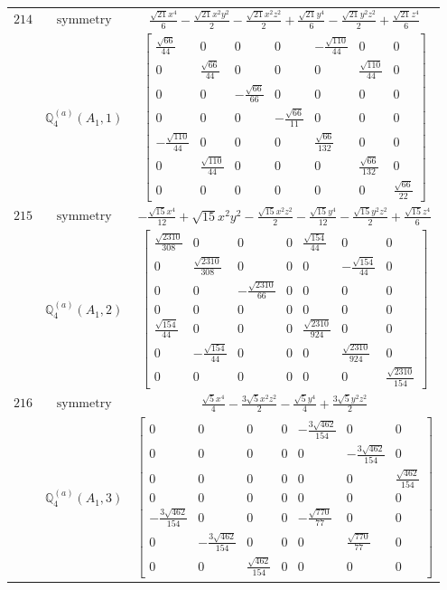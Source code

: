 \documentclass[fleqn,8pt,landscape]{jsarticle}
\begin{document}
\begin{longtable}{ccc}
$ 214 $ & $ \text{symmetry} $ & $ \frac{\sqrt{21} x^{4}}{6} - \frac{\sqrt{21} x^{2} y^{2}}{2} - \frac{\sqrt{21} x^{2} z^{2}}{2} + \frac{\sqrt{21} y^{4}}{6} - \frac{\sqrt{21} y^{2} z^{2}}{2} + \frac{\sqrt{21} z^{4}}{6} $ \\
$  $ & $ \mathbb{Q}_{4}^{(a)}(A_{1},1) $ & $ \begin{bmatrix} \frac{\sqrt{66}}{44} & 0 & 0 & 0 & - \frac{\sqrt{110}}{44} & 0 & 0 \\ 0 & \frac{\sqrt{66}}{44} & 0 & 0 & 0 & \frac{\sqrt{110}}{44} & 0 \\ 0 & 0 & - \frac{\sqrt{66}}{66} & 0 & 0 & 0 & 0 \\ 0 & 0 & 0 & - \frac{\sqrt{66}}{11} & 0 & 0 & 0 \\ - \frac{\sqrt{110}}{44} & 0 & 0 & 0 & \frac{\sqrt{66}}{132} & 0 & 0 \\ 0 & \frac{\sqrt{110}}{44} & 0 & 0 & 0 & \frac{\sqrt{66}}{132} & 0 \\ 0 & 0 & 0 & 0 & 0 & 0 & \frac{\sqrt{66}}{22} \end{bmatrix} $ \\ \hline
$ 215 $ & $ \text{symmetry} $ & $ - \frac{\sqrt{15} x^{4}}{12} + \sqrt{15} x^{2} y^{2} - \frac{\sqrt{15} x^{2} z^{2}}{2} - \frac{\sqrt{15} y^{4}}{12} - \frac{\sqrt{15} y^{2} z^{2}}{2} + \frac{\sqrt{15} z^{4}}{6} $ \\
$  $ & $ \mathbb{Q}_{4}^{(a)}(A_{1},2) $ & $ \begin{bmatrix} \frac{\sqrt{2310}}{308} & 0 & 0 & 0 & \frac{\sqrt{154}}{44} & 0 & 0 \\ 0 & \frac{\sqrt{2310}}{308} & 0 & 0 & 0 & - \frac{\sqrt{154}}{44} & 0 \\ 0 & 0 & - \frac{\sqrt{2310}}{66} & 0 & 0 & 0 & 0 \\ 0 & 0 & 0 & 0 & 0 & 0 & 0 \\ \frac{\sqrt{154}}{44} & 0 & 0 & 0 & \frac{\sqrt{2310}}{924} & 0 & 0 \\ 0 & - \frac{\sqrt{154}}{44} & 0 & 0 & 0 & \frac{\sqrt{2310}}{924} & 0 \\ 0 & 0 & 0 & 0 & 0 & 0 & \frac{\sqrt{2310}}{154} \end{bmatrix} $ \\ \hline
$ 216 $ & $ \text{symmetry} $ & $ \frac{\sqrt{5} x^{4}}{4} - \frac{3 \sqrt{5} x^{2} z^{2}}{2} - \frac{\sqrt{5} y^{4}}{4} + \frac{3 \sqrt{5} y^{2} z^{2}}{2} $ \\
$  $ & $ \mathbb{Q}_{4}^{(a)}(A_{1},3) $ & $ \begin{bmatrix} 0 & 0 & 0 & 0 & - \frac{3 \sqrt{462}}{154} & 0 & 0 \\ 0 & 0 & 0 & 0 & 0 & - \frac{3 \sqrt{462}}{154} & 0 \\ 0 & 0 & 0 & 0 & 0 & 0 & \frac{\sqrt{462}}{154} \\ 0 & 0 & 0 & 0 & 0 & 0 & 0 \\ - \frac{3 \sqrt{462}}{154} & 0 & 0 & 0 & - \frac{\sqrt{770}}{77} & 0 & 0 \\ 0 & - \frac{3 \sqrt{462}}{154} & 0 & 0 & 0 & \frac{\sqrt{770}}{77} & 0 \\ 0 & 0 & \frac{\sqrt{462}}{154} & 0 & 0 & 0 & 0 \end{bmatrix} $ \\ \hline

\end{longtable}
\end{document}
